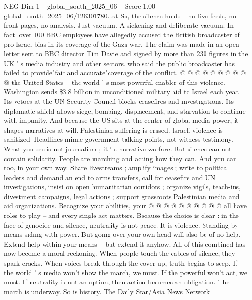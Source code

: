 \begin{textsample}{NEG Dim 1 – global\_south\_2025\_06 – Score 1.00 – global\_south\_2025\_06/126301780.txt}
So, the silence holds -- no live feeds, no front pages, no analysis.
Just vacuum.
A sickening and deliberate vacuum.
In fact, over 100 BBC employees have allegedly accused the British broadcaster of pro-Israel bias in its coverage of the Gaza war.
The claim was made in an open letter sent to BBC director Tim Davie and signed by more than 230 figures in the UK ' s media industry and other sectors, who said the public broadcaster has failed to provide"fair and accurate"coverage of the conflict. @ @ @ @ @ @ @ @ @ @ the United States -- the world ' s most powerful enabler of this violence.
Washington sends \$3.8 billion in unconditioned military aid to Israel each year.
Its vetoes at the UN Security Council blocks ceasefires and investigations.
Its diplomatic shield allows siege, bombing, displacement, and starvation to continue with impunity.
And because the US sits at the center of global media power, it shapes narratives at will.
Palestinian suffering is erased.
Israeli violence is sanitized.
Headlines mimic government talking points, not witness testimony.
What you see is not journalism ; it ' s narrative warfare.
But silence can not contain solidarity.
People are marching and acting how they can.
And you can too, in your own way.
Share livestreams ; amplify images ; write to political leaders and demand an end to arms transfers, call for ceasefire and UN investigations, insist on open humanitarian corridors ; organize vigils, teach-ins, divestment campaigns, legal actions ; support grassroots Palestinian media and aid organizations.
Recognize your abilities, your @ @ @ @ @ @ @ @ @ @ all have roles to play -- and every single act matters.
Because the choice is clear : in the face of genocide and silence, neutrality is not peace.
It is violence.
Standing by means siding with power.
But going over your own head will also be of no help.
Extend help within your means -- but extend it anyhow.
All of this combined has now become a moral reckoning.
When people touch the cables of silence, they spark cracks.
When voices break through the cover-up, truth begins to seep.
If the world ' s media won't show the march, we must.
If the powerful won't act, we must.
If neutrality is not an option, then action becomes an obligation.
The march is underway.
So is history.
The Daily Star/Asia News Network

\end{textsample}
